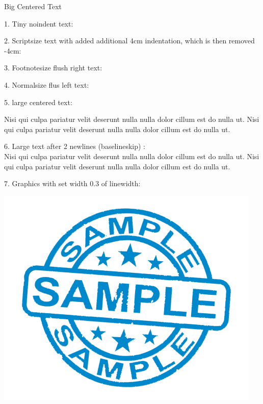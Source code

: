 \documentclass[12pt]{article}
\begin{document}
\begin{center}
    {\Huge Big Centered Text}
\end{center}

1. Tiny noindent text: \\
{\tiny\noindent\Blindtext[1][1]}

2. Scriptsize text with added additional 4cm indentation, which is then removed -4cm:

\addtolength{\parindent}{4cm}
{\scriptsize\Blindtext[1][1]}
\addtolength{\parindent}{-4cm}

3. Footnotesize flush right text:
\begin{flushright}
{\footnotesize\Blindtext[1][1]}
\end{flushright}

4. Normalsize flus left text:
\begin{flushleft}
{\normalsize\Blindtext[1][1]}
\end{flushleft}

5. large centered text:
\begin{center}
{\large Nisi qui culpa pariatur velit deserunt nulla nulla dolor cillum est do nulla ut. Nisi qui culpa pariatur velit deserunt nulla nulla dolor cillum est do nulla ut.}
\end{center}

6. Large text after 2 newlines (baselineskip) : \\[2\baselineskip]
{\Large Nisi qui culpa pariatur velit deserunt nulla nulla dolor cillum est do nulla ut. Nisi qui culpa pariatur velit deserunt nulla nulla dolor cillum est do nulla ut.}

7. Graphics with set width 0.3 of linewidth:
\begin{center}
    \includegraphics[width=0.3\linewidth]{sample.png}
\end{center}

\newpage

\tableofcontents
\listoffigures
\listoftables
\setcounter{section}{8}

\newpage
\end{document}
